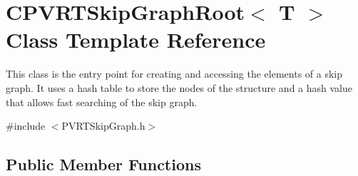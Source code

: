 \hypertarget{class_c_p_v_r_t_skip_graph_root}{\section{C\+P\+V\+R\+T\+Skip\+Graph\+Root$<$ T $>$ Class Template Reference}
\label{class_c_p_v_r_t_skip_graph_root}
}


This class is the entry point for creating and accessing the elements of a skip graph. It uses a hash table to store the nodes of the structure and a hash value that allows fast searching of the skip graph.  




{\ttfamily \#include $<$P\+V\+R\+T\+Skip\+Graph.\+h$>$}

\subsection*{Public Member Functions}
